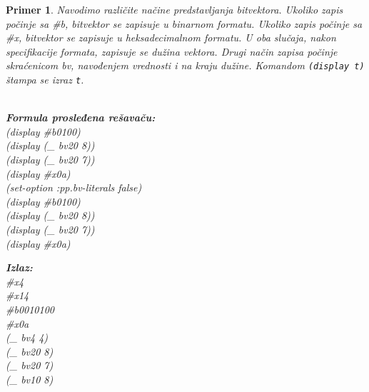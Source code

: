 \documentclass[12pt,oneside]{memoir}
\newtheorem{primer}{Primer}
\begin{document}
\begin{primer} Navodimo različite načine predstavljanja bitvektora. Ukoliko zapis počinje sa \#b, bitvektor se zapisuje u binarnom formatu. Ukoliko zapis počinje sa \#x, bitvektor se zapisuje u heksadecimalnom formatu. U oba slučaja, nakon specifikacije formata, zapisuje se dužina vektora. Drugi način zapisa počinje skraćenicom bv, navođenjem vrednosti i na kraju dužine. Komandom \texttt{(display t)} štampa se izraz \texttt{t}.\\\\
\begin{minipage}[b]{0.45\textwidth}
\textbf{Formula prosleđena rešavaču:}
\\(display \#b0100)
\\(display (\_ bv20 8))
\\(display (\_ bv20 7))
\\(display \#x0a) 
\\(set-option :pp.bv-literals false)
\\(display \#b0100)
\\(display (\_ bv20 8))
\\(display (\_ bv20 7))
\\(display \#x0a)
\end{minipage}
\hspace{2.5cm}
\begin{minipage}[t]{0.4\textwidth}
\vspace{-5.93cm}
\textbf{Izlaz:}
\\\#x4 
\\\#x14 
\\\#b0010100 
\\\#x0a 
\\(\_ bv4 4) 
\\(\_ bv20 8) 
\\(\_ bv20 7) 
\\(\_ bv10 8)
\end{minipage}
\end{primer}
\end{document}
